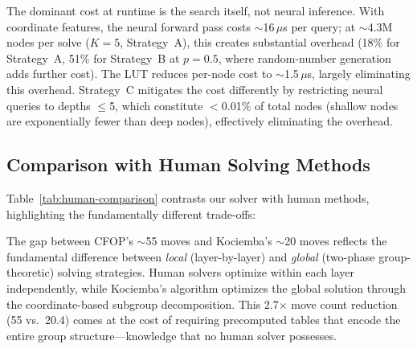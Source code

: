 \documentclass[conference]{IEEEtran}
\begin{document}
The dominant cost at runtime is the search itself, not neural inference. With coordinate features, the neural forward pass costs $\sim$16\,$\mu$s per query; at $\sim$4.3M nodes per solve ($K{=}5$, Strategy~A), this creates substantial overhead (18\% for Strategy~A, 51\% for Strategy~B at $p{=}0.5$, where random-number generation adds further cost). The LUT reduces per-node cost to $\sim$1.5\,$\mu$s, largely eliminating this overhead. Strategy~C mitigates the cost differently by restricting neural queries to depths $\leq$5, which constitute $<$0.01\% of total nodes (shallow nodes are exponentially fewer than deep nodes), effectively eliminating the overhead.

\subsection{Comparison with Human Solving Methods}
\label{sec:human-comparison}

Table~\ref{tab:human-comparison} contrasts our solver with human methods, highlighting the fundamentally different trade-offs:

\begin{table}[htbp]
\centering
\caption{Solution quality: algorithmic vs.\ human methods.}
\label{tab:human-comparison}
\end{table}

The gap between CFOP's $\sim$55 moves and Kociemba's $\sim$20 moves reflects the fundamental difference between \emph{local} (layer-by-layer) and \emph{global} (two-phase group-theoretic) solving strategies. Human solvers optimize within each layer independently, while Kociemba's algorithm optimizes the global solution through the coordinate-based subgroup decomposition. This 2.7$\times$ move count reduction (55 vs.\ 20.4) comes at the cost of requiring precomputed tables that encode the entire group structure---knowledge that no human solver possesses.
\end{document}
